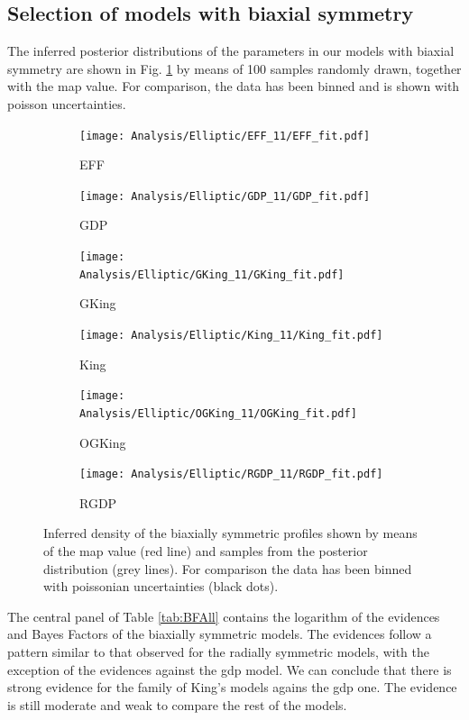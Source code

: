 \subsection{Selection of models with biaxial symmetry}

The inferred posterior distributions of the parameters in our models with biaxial symmetry are shown in Fig. \ref{fig:PSDEll} by means of 100 samples randomly drawn, together with the \gls{map} value. For comparison, the data has been binned and is shown with poisson uncertainties.

\begin {figure}
\centering
\begin{subfigure}[t]{0.45\textwidth}
 \texttt{[image: Analysis/Elliptic/EFF\_11/EFF\_fit.pdf]}
 \caption{EFF}  
    \end{subfigure}
    \begin{subfigure}[t]{0.45\textwidth}
 \texttt{[image: Analysis/Elliptic/GDP\_11/GDP\_fit.pdf]}
 \caption{GDP}  
    \end{subfigure}
    \begin{subfigure}[t]{0.45\textwidth}
 \texttt{[image: Analysis/Elliptic/GKing\_11/GKing\_fit.pdf]}
 \caption{GKing}  
    \end{subfigure}
    \begin{subfigure}[t]{0.45\textwidth}
 \texttt{[image: Analysis/Elliptic/King\_11/King\_fit.pdf]}
 \caption{King}  
    \end{subfigure}
    \begin{subfigure}[t]{0.45\textwidth}
 \texttt{[image: Analysis/Elliptic/OGKing\_11/OGKing\_fit.pdf]}
 \caption{OGKing}  
    \end{subfigure}
        \begin{subfigure}[t]{0.45\textwidth}
 \texttt{[image: Analysis/Elliptic/RGDP\_11/RGDP\_fit.pdf]}
 \caption{RGDP}  
    \end{subfigure}
  \caption{Inferred density of the biaxially symmetric profiles shown by means of the \gls{map} value (red line) and samples from the posterior distribution (grey lines). 
  For comparison the data has been binned with poissonian uncertainties (black dots).}
\label{fig:PSDEll}
\end {figure}

The central panel of  Table \ref{tab:BFAll} contains the
logarithm of the evidences and Bayes Factors of the biaxially symmetric models. The evidences follow a pattern similar to 
that observed for the radially symmetric models, with the exception of the evidences against the \gls{gdp} model. We can conclude that there is
strong evidence for the family of King's models agains the \gls{gdp} one.
The evidence is still moderate and weak to compare the rest of the models.

